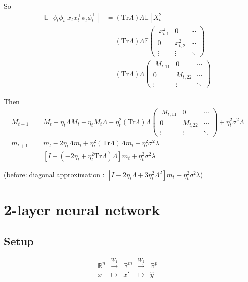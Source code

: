 \documentclass{article}
\newcommand{\R}{\mathbb{R}}
\newcommand{\E}{\mathbb{E}}
\newcommand{\tr}{\mathrm{Tr}}
\begin{document}
So \begin{align*}
\E[\phi_t \phi_t^\top x_t x_t^\top \phi_t\phi_t^\top] &= 
(\tr \Lambda) \Lambda \E[X_t^2] 
\\&=
(\tr \Lambda) \Lambda \E\begin{pmatrix}
\ x_{t,1}^2 & 0                  & \cdots \\
0                  & x_{t,2}^2 & \cdots \\
\vdots             & \vdots             & \ddots
\end{pmatrix}
\\&=
(\tr \Lambda) \Lambda \begin{pmatrix}
\ M_{t,11} & 0                  & \cdots \\
0                  & M_{t,22} & \cdots \\
\vdots             & \vdots             & \ddots
\end{pmatrix}
\end{align*}

Then 
\begin{align*}
M_{t+1} &=
M_t - \eta_t \Lambda M_t - \eta_t M_t \Lambda + \eta_t^2 (\tr \Lambda) \Lambda \begin{pmatrix}
\ M_{t,11} & 0                  & \cdots \\
0                  & M_{t,22} & \cdots \\
\vdots             & \vdots             & \ddots
\end{pmatrix} + \eta_t^2\sigma^2\Lambda\\
m_{t+1} &= m_t - 2 \eta_t \Lambda m_t +  \eta_t^2  (\tr \Lambda) \Lambda m_t + \eta_t^2\sigma^2\lambda
\\&=
\left[I + (-2\eta_t   + \eta_t^2 \tr \Lambda) \Lambda  \right]m_t + \eta_t^2\sigma^2\lambda
\end{align*}

(before: diagonal approximation : $\left[I - 2\eta_t\Lambda + 3\eta_t^2 \Lambda^2 \right] m_t + \eta_t^2 \sigma^2 \lambda$)

\section{2-layer neural network}

\subsection{Setup}

\[\begin{array}{lllll}
\R^n & \overset{W_1}\longrightarrow & \R^m & \overset{W_2}\longrightarrow & \R^p\\
x & \longmapsto & x' & \longmapsto & \hat y
\end{array}\]
\end{document}
